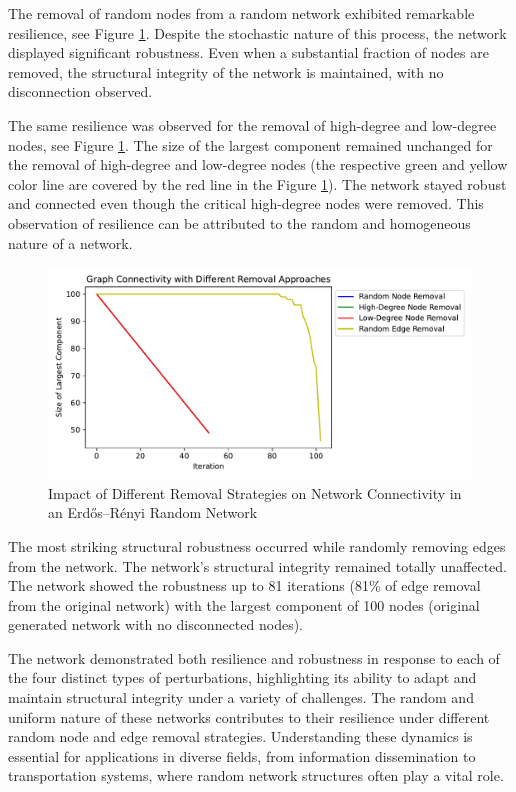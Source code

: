\documentclass[conference]{IEEEtran} %
\begin{document}
The removal of random nodes from a random network exhibited remarkable resilience, see Figure \ref{fig:12.1}. Despite the stochastic nature of this process, the network displayed significant robustness. Even when a substantial fraction of nodes are removed, the structural integrity of the network is maintained, with no disconnection observed.

The same resilience was observed for the removal of high-degree and low-degree nodes, see Figure \ref{fig:12.1}. The size of the largest component remained unchanged for the removal of high-degree and low-degree nodes (the respective green and yellow color line are covered by the red line in the Figure \ref{fig:12.1}). The network stayed robust and connected even though the critical high-degree nodes were removed. This observation of resilience can be attributed to the random and homogeneous nature of a network.

\begin{figure}[t]
  \centering
  \includegraphics[width=1\linewidth]{random_network_connectivity_plot.pdf}
  \caption{Impact of Different Removal Strategies on Network Connectivity in an Erdős–Rényi Random Network}
  \label{fig:12.1}
\end{figure}

The most striking structural robustness occurred while randomly removing edges from the network. The network's structural integrity remained totally unaffected. The network showed the robustness up to 81 iterations (81\% of edge removal from the original network) with the largest component of 100 nodes (original generated network with no disconnected nodes).

The network demonstrated both resilience and robustness in response to each of the four distinct types of perturbations, highlighting its ability to adapt and maintain structural integrity under a variety of challenges. The random and uniform nature of these networks contributes to their resilience under different random node and edge removal strategies. Understanding these dynamics is essential for applications in diverse fields, from information dissemination to transportation systems, where random network structures often play a vital role.
\end{document}
